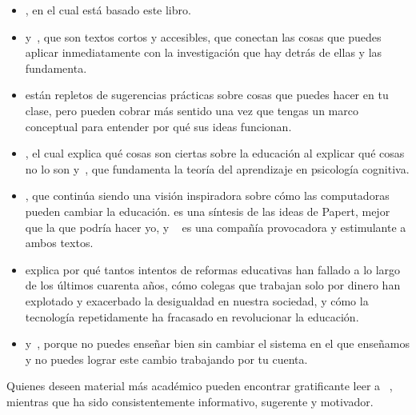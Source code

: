 \begin{itemize}

\item
 ,
 en el cual está basado este libro. 
\item
 \cite{Lang2016} y~\cite{Hust2012}, que son textos cortos y accesibles, que conectan las cosas que puedes aplicar 
 inmediatamente con la investigación que hay detrás de ellas y las fundamenta. 

\item
 \cite{Berg2012,Lemo2014,Majo2015,Broo2016,Rice2018,Wein2018b}
 están repletos de sugerencias prácticas sobre cosas que puedes hacer en tu clase,
pero pueden cobrar más sentido una vez que tengas un marco conceptual para entender por qué sus ideas funcionan. 

\item
 \cite{DeBr2015},
 el cual explica qué cosas son ciertas sobre la educación al explicar qué cosas no lo son y~\cite{Dida2016},
 que fundamenta la teoría del aprendizaje en psicología cognitiva. 

\item
 \cite{Pape1993},
 que continúa siendo una visión inspiradora sobre cómo las computadoras pueden cambiar la educación.
 es una síntesis de las ideas de Papert, mejor que la que podría hacer yo, y ~\cite{Craw2010} es una compañía provocadora y estimulante a ambos textos.

\item
 \cite{Gree2014,McMi2017,Watt2014} explica por qué tantos intentos de reformas educativas 
 han fallado a lo largo de los últimos cuarenta años, cómo colegas que trabajan solo por dinero han explotado 
 y exacerbado la desigualdad en nuestra sociedad, y cómo la tecnología repetidamente ha fracasado en revolucionar la educación. 

\item
 \cite{Brow2007} y~\cite{Mann2015},
 porque no puedes enseñar bien sin cambiar el sistema en el que enseñamos
y no puedes lograr este cambio trabajando por tu cuenta.

\end{itemize}

Quienes deseen material más académico pueden encontrar gratificante leer a ~\cite{Guzd2015a,Hazz2014,Sent2018,Finc2019,Hpl2018},
mientras que  ha sido consistentemente informativo, sugerente y motivador.


